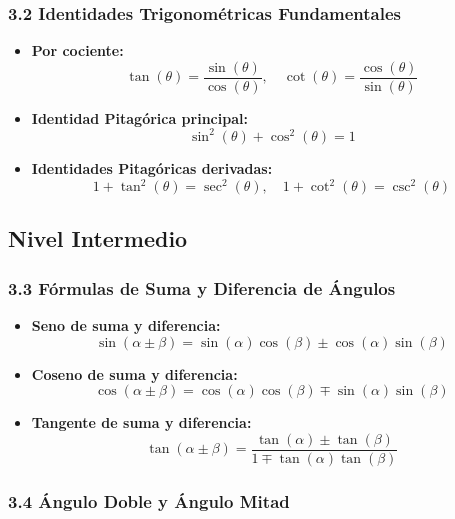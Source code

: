 \documentclass[11pt,a4paper]{article}
\begin{document}
\subsubsection*{3.2 Identidades Trigonométricas Fundamentales}

\begin{itemize}
  \item \textbf{Por cociente:}
  \[
    \tan(\theta) = \frac{\sin(\theta)}{\cos(\theta)}, \quad \cot(\theta) = \frac{\cos(\theta)}{\sin(\theta)}
  \]
  \item \textbf{Identidad Pitagórica principal:}
  \[
    \sin^2(\theta) + \cos^2(\theta) = 1
  \]
  \item \textbf{Identidades Pitagóricas derivadas:}
  \[
    1 + \tan^2(\theta) = \sec^2(\theta), \quad 1 + \cot^2(\theta) = \csc^2(\theta)
  \]
\end{itemize}

\subsection*{Nivel Intermedio}

\subsubsection*{3.3 Fórmulas de Suma y Diferencia de Ángulos}

\begin{itemize}
  \item \textbf{Seno de suma y diferencia:}
  \[
    \sin(\alpha \pm \beta) = \sin(\alpha)\cos(\beta) \pm \cos(\alpha)\sin(\beta)
  \]
  \item \textbf{Coseno de suma y diferencia:}
  \[
    \cos(\alpha \pm \beta) = \cos(\alpha)\cos(\beta) \mp \sin(\alpha)\sin(\beta)
  \]
  \item \textbf{Tangente de suma y diferencia:}
  \[
    \tan(\alpha \pm \beta) = \frac{\tan(\alpha) \pm \tan(\beta)}{1 \mp \tan(\alpha)\tan(\beta)}
  \]
\end{itemize}

\subsubsection*{3.4 Ángulo Doble y Ángulo Mitad}
\end{document}
